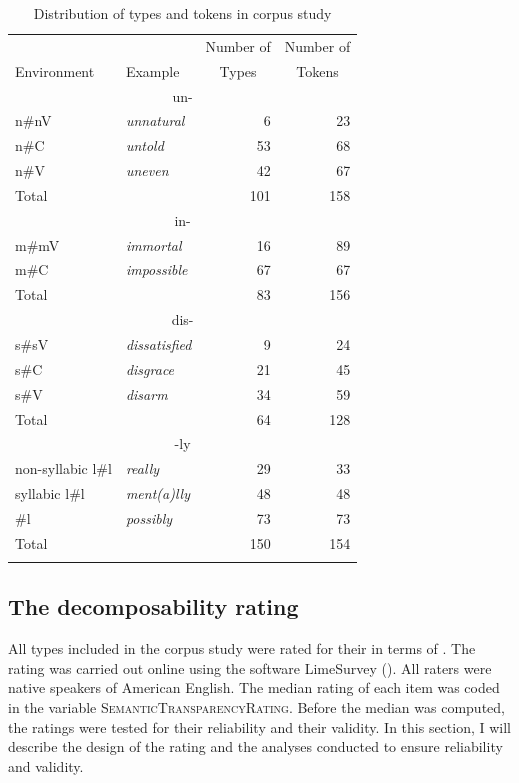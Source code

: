 \begin{table}
	\caption{Distribution of types and tokens in corpus study\label{tbl:distribution of types and tokens in corpus}}
	\begin{tabular}{llrr}
        \lsptoprule
                        &         &  Number of & Number of\\
            Environment & Example &  \multicolumn{1}{c}{Types} & \multicolumn{1}{c}{Tokens}\\\midrule	
			\multicolumn{4}{c}{un-}\\\midrule
			n\#nV&\color{lsMidBlue}\textit{unnatural} & 6 & 23\\ 
			n\#C&\color{lsMidBlue}\textit{untold} & 53 & 68\\ 
			n\#V&\color{lsMidBlue}\textit{uneven} & 42 & 67\\
			Total&  & 101 & 158\\\midrule
			\multicolumn{4}{c}{in-}\\\midrule 
			m\#mV&\color{lsMidBlue}\textit{immortal} & 16 & 89\\ 
			m\#C&\color{lsMidBlue}\textit{impossible} & 67 & 67\\   
			Total&  & 83 & 156\\\midrule
			\multicolumn{4}{c}{dis-}\\\midrule   	
			s\#sV&\color{lsMidBlue}\textit{dissatisfied} & 9 & 24\\ 
			s\#C&\color{lsMidBlue}\textit{disgrace} & 21 & 45\\ 
			s\#V&\color{lsMidBlue}\textit{disarm} & 34 & 59\\
			Total&  & 64 & 128\\\midrule
			\multicolumn{4}{c}{-ly}\\\midrule   	
			non-\is{syllabicity}syllabic l\#l &\color{lsMidBlue}\textit{really} & 29  & 33 \\ 
			\is{syllabicity}syllabic 	l\#l &\color{lsMidBlue}\textit{ment(a)lly} & 48 & 48 \\ 
			\#l &\color{lsMidBlue}\textit{possibly} & 73 & 73\\
			Total&  & 150  & 154\\ 	
			\lspbottomrule                                                                                
		\end{tabular}
\end{table}

\subsection{The decomposability rating} \label{decomposability rating corpus}
All types included in the corpus study were rated for their  in terms of . The rating was carried out online using the software LimeSurvey (\citealt{LimeSurveyProjectTeam.2015}). All raters were native speakers of American English. The median rating of each item was coded in the variable  \textsc{SemanticTransparencyRating}. Before the median was computed, the ratings were tested for their reliability and their validity. In this section, I will describe the design of the rating and the analyses conducted to ensure reliability and validity. 

